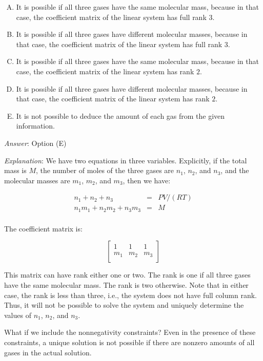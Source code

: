 \documentclass[10pt]{amsart}
\begin{document}
\begin{enumerate}
  \begin{enumerate}[(A)]
  \item It is possible if all three gases have the same molecular mass,
    because in that case, the coefficient matrix of the linear system
    has full rank $3$.
  \item It is possible if all three gases have different molecular
    masses, because in that case, the coefficient matrix of the linear
    system has full rank $3$.
  \item It is possible if all three gases have the same molecular mass,
    because in that case, the coefficient matrix of the linear system
    has rank $2$.
  \item It is possible if all three gases have different molecular
    masses, because in that case, the coefficient matrix of the linear
    system has rank $2$.
  \item It is not possible to deduce the amount of each gas from the
    given information.
  \end{enumerate}

  {\em Answer}: Option (E)

  {\em Explanation}: We have two equations in three
  variables. Explicitly, if the total mass is $M$, the number of moles
  of the three gases are $n_1$, $n_2$, and $n_3$, and the molecular
  masses are $m_1$, $m_2$, and $m_3$, then we have:

  \begin{eqnarray*}
    n_1 + n_2 + n_3 & = & PV/(RT)\\
    n_1m_1 + n_2m_2 + n_3m_3 & = & M \\
  \end{eqnarray*}

  The coefficient matrix is:

  $$\left[\begin{matrix} 1 & 1 & 1 \\ m_1 & m_2 & m_3 \\\end{matrix}\right]$$

  This matrix can have rank either one or two. The rank is one if all
  three gases have the same molecular mass. The rank is two
  otherwise. Note that in either case, the rank is less than three,
  i.e., the system does not have full column rank. Thus, it will not
  be possible to solve the system and uniquely determine the values of
  $n_1$, $n_2$, and $n_3$.

  What if we include the nonnegativity constraints? Even in the
  presence of these constraints, a unique solution is not possible if
  there are nonzero amounts of all gases in the actual solution.


\end{enumerate}
\end{document}
